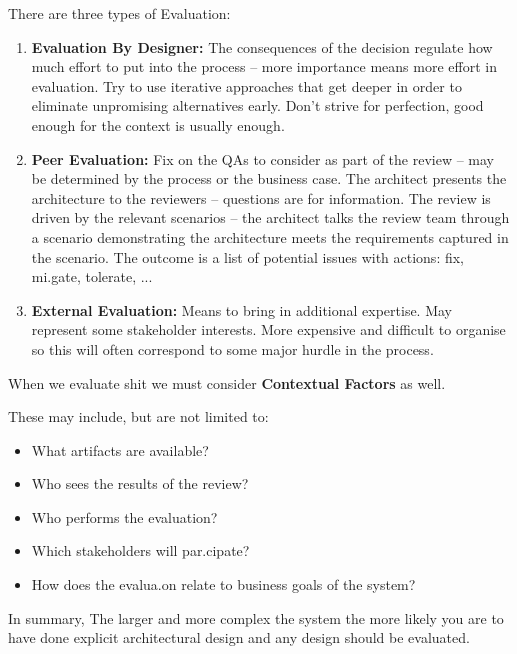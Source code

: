 \documentclass[a4paper]{report}
\begin{document}
There are three types of Evaluation:


\begin{enumerate}
\item \textbf{Evaluation By Designer:} The	consequences	of	the	decision	regulate	
how	much	effort	to	put	into	the	process	–	
more	importance	means	more	effort	in	
evaluation. Try	to	use	iterative	approaches	that	get	
deeper	in	order	to	eliminate	unpromising	
alternatives	early.  Don’t	strive	for	perfection,	good	enough	for	
the	context	is	usually	enough.	
\item \textbf{Peer Evaluation:} Fix	on	the	QAs	to	consider	as	part	of	the	review	–	
may	be	determined	by	the	process	or	the	
business	case. The	architect	presents	the	architecture	to	the	
reviewers	–	questions	are	for	information.	The	review	is	driven	by	the	relevant	scenarios	–	
the	architect	talks	the	review	team	through	a	
scenario	demonstrating	the	architecture	meets	
the	requirements	captured	in	the	scenario. The	outcome	is	a	list	of	potential	issues	with	
actions:	fix,	mi.gate,	tolerate,	...	
\item \textbf{External Evaluation:} Means	to	bring	in	additional	expertise. May	represent	some	stakeholder	interests. More	expensive	and	difficult	to	organise	so	
this	will	often	correspond	to	some	major	
hurdle	in	the	process.	
\end{enumerate}

When we evaluate shit we must consider \textbf{Contextual Factors} as well.

These may include, but are not limited to:
\begin{itemize}
\item What	artifacts	are	available?	
\item Who	sees	the	results	of	the	review?	
\item Who	performs	the	evaluation?	
\item Which	stakeholders	will	par.cipate?	
\item How	does	the	evalua.on	relate	to	business	
goals	of	the	system?	
\end{itemize}

In summary, The	larger	and	more	complex	the	system	the	
more	likely	you	are	to	have	done	explicit	
architectural	design	and	any	design	should	be	
evaluated.
\end{document}
